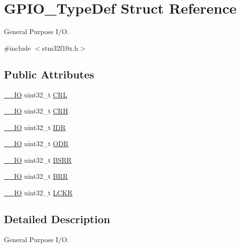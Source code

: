 \hypertarget{struct_g_p_i_o___type_def}{}\section{G\+P\+I\+O\+\_\+\+Type\+Def Struct Reference}
\label{struct_g_p_i_o___type_def}


General Purpose I/O.  




{\ttfamily \#include $<$stm32f10x.\+h$>$}

\subsection*{Public Attributes}
\begin{DoxyCompactItemize}
\item 
\hyperlink{core__sc300_8h_aec43007d9998a0a0e01faede4133d6be}{\+\_\+\+\_\+\+IO} uint32\+\_\+t \hyperlink{struct_g_p_i_o___type_def_a218d21e9ca712cec4ca8f00406b2ec29}{C\+RL}
\item 
\hyperlink{core__sc300_8h_aec43007d9998a0a0e01faede4133d6be}{\+\_\+\+\_\+\+IO} uint32\+\_\+t \hyperlink{struct_g_p_i_o___type_def_afe53502a3dbf9e7dcf9ac83f67ac481d}{C\+RH}
\item 
\hyperlink{core__sc300_8h_aec43007d9998a0a0e01faede4133d6be}{\+\_\+\+\_\+\+IO} uint32\+\_\+t \hyperlink{struct_g_p_i_o___type_def_acf11156409414ad8841bb0b62959ee96}{I\+DR}
\item 
\hyperlink{core__sc300_8h_aec43007d9998a0a0e01faede4133d6be}{\+\_\+\+\_\+\+IO} uint32\+\_\+t \hyperlink{struct_g_p_i_o___type_def_a6fb78f4a978a36032cdeac93ac3c9c8b}{O\+DR}
\item 
\hyperlink{core__sc300_8h_aec43007d9998a0a0e01faede4133d6be}{\+\_\+\+\_\+\+IO} uint32\+\_\+t \hyperlink{struct_g_p_i_o___type_def_acd6f21e08912b484c030ca8b18e11cd6}{B\+S\+RR}
\item 
\hyperlink{core__sc300_8h_aec43007d9998a0a0e01faede4133d6be}{\+\_\+\+\_\+\+IO} uint32\+\_\+t \hyperlink{struct_g_p_i_o___type_def_aab918bfbfae459789db1fd0b220c7f21}{B\+RR}
\item 
\hyperlink{core__sc300_8h_aec43007d9998a0a0e01faede4133d6be}{\+\_\+\+\_\+\+IO} uint32\+\_\+t \hyperlink{struct_g_p_i_o___type_def_a95a59d4b1d52be521f3246028be32f3e}{L\+C\+KR}
\end{DoxyCompactItemize}


\subsection{Detailed Description}
General Purpose I/O. 

